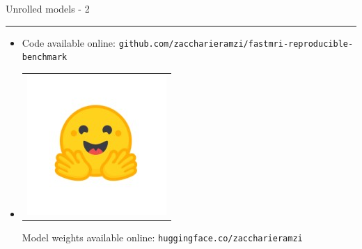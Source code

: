 \begin{frame}{Unrolled models - 2}
\begin{overprint}
    \noindent\rule{\textwidth}{1pt}

        \begin{itemize}
            \item {} Code available online: \texttt{github.com/zaccharieramzi/fastmri-reproducible-benchmark}
            \item\begin{tabular}{@{}c@{}}\includegraphics[width=3ex]{Figures/hf_logo.jpeg}\end{tabular}Model weights available online: \texttt{huggingface.co/zaccharieramzi}
        \end{itemize}
    
\end{overprint}
    


\end{frame}

